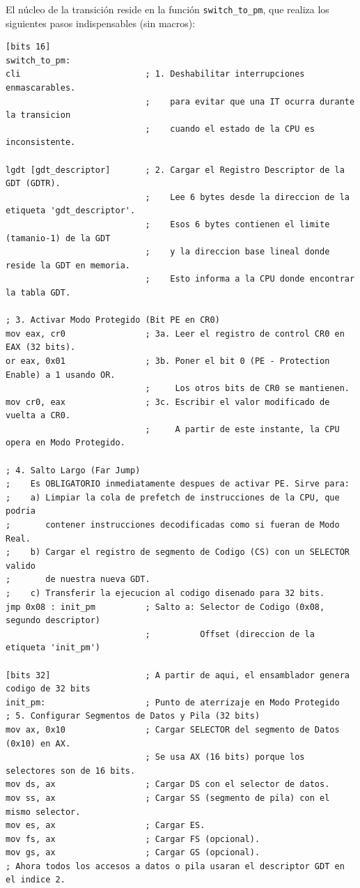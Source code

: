 El núcleo de la transición reside en la función \texttt{switch\_to\_pm}, que realiza los siguientes pasos indispensables (sin macros):

\newpage

\begin{lstlisting}[style=NasmStyle, breaklines=true,
    caption={\texttt{switch\_to\_pm.asm} (Nucleo de la transicion)}]
[bits 16]
switch_to_pm:
cli                         ; 1. Deshabilitar interrupciones enmascarables.
                            ;    para evitar que una IT ocurra durante la transicion
                            ;    cuando el estado de la CPU es inconsistente.

lgdt [gdt_descriptor]       ; 2. Cargar el Registro Descriptor de la GDT (GDTR).
                            ;    Lee 6 bytes desde la direccion de la etiqueta 'gdt_descriptor'.
                            ;    Esos 6 bytes contienen el limite (tamanio-1) de la GDT
                            ;    y la direccion base lineal donde reside la GDT en memoria.
                            ;    Esto informa a la CPU donde encontrar la tabla GDT.

; 3. Activar Modo Protegido (Bit PE en CR0)
mov eax, cr0                ; 3a. Leer el registro de control CR0 en EAX (32 bits).
or eax, 0x01                ; 3b. Poner el bit 0 (PE - Protection Enable) a 1 usando OR.
                            ;     Los otros bits de CR0 se mantienen.
mov cr0, eax                ; 3c. Escribir el valor modificado de vuelta a CR0.
                            ;     A partir de este instante, la CPU opera en Modo Protegido.

; 4. Salto Largo (Far Jump)
;    Es OBLIGATORIO inmediatamente despues de activar PE. Sirve para:
;    a) Limpiar la cola de prefetch de instrucciones de la CPU, que podria
;       contener instrucciones decodificadas como si fueran de Modo Real.
;    b) Cargar el registro de segmento de Codigo (CS) con un SELECTOR valido
;       de nuestra nueva GDT.
;    c) Transferir la ejecucion al codigo disenado para 32 bits.
jmp 0x08 : init_pm          ; Salto a: Selector de Codigo (0x08, segundo descriptor)
                            ;          Offset (direccion de la etiqueta 'init_pm')

[bits 32]                   ; A partir de aqui, el ensamblador genera codigo de 32 bits
init_pm:                    ; Punto de aterrizaje en Modo Protegido
; 5. Configurar Segmentos de Datos y Pila (32 bits)
mov ax, 0x10                ; Cargar SELECTOR del segmento de Datos (0x10) en AX.
                            ; Se usa AX (16 bits) porque los selectores son de 16 bits.
mov ds, ax                  ; Cargar DS con el selector de datos.
mov ss, ax                  ; Cargar SS (segmento de pila) con el mismo selector.
mov es, ax                  ; Cargar ES.
mov fs, ax                  ; Cargar FS (opcional).
mov gs, ax                  ; Cargar GS (opcional).
; Ahora todos los accesos a datos o pila usaran el descriptor GDT en el indice 2.


\end{lstlisting}
